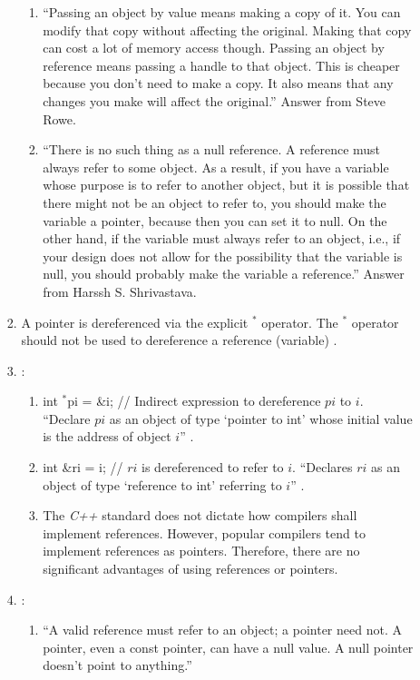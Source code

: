 \begin{enumerate}
\begin{enumerate}
\begin{enumerate}
\begin{enumerate}
			\item ``Passing an object by value means making a copy of it. You can modify that copy without affecting the original. Making that copy can cost a lot of memory access though. Passing an object by reference means passing a handle to that object. This is cheaper because you don't need to make a copy. It also means that any changes you make will affect the original.'' Answer from Steve Rowe.
			\item ``There is no such thing as a null reference. A reference must always refer to some object. As a result, if you have a variable whose purpose is to refer to another object, but it is possible that there might not be an object to refer to, you should make the variable a pointer, because then you can set it to null. On the other hand, if the variable must always refer to an object, i.e., if your design does not allow for the possibility that the variable is null, you should probably make the variable a reference.'' Answer from Harssh S. Shrivastava.
			\end{enumerate}
		\item A pointer is dereferenced via the explicit $^{\ast}$ operator. The $^{\ast}$ operator should not be used to dereference a reference (variable) \cite{Saks2001}.
		\item \cite{Saks2001}: \vspace{-0.1cm}
			\begin{enumerate} \itemsep -1pt
			\item int $^{\ast}$pi = {\&}i; // Indirect expression to dereference $pi$ to $i$. ``Declare $pi$ as an object of type `pointer to int' whose initial value is the address of object $i$'' \cite{Saks2001a}.
			\item int {\&}ri = i; // $ri$ is dereferenced to refer to $i$. ``Declares $ri$ as an object of type `reference to int' referring to $i$'' \cite{Saks2001a}.
			\item The {\it C++} standard does not dictate how compilers shall implement references. However, popular compilers tend to implement references as pointers. Therefore, there are no significant advantages of using references or pointers.
			\end{enumerate}
		\item \cite{Saks2001a}: \vspace{-0.1cm}
			\begin{enumerate} \itemsep -1pt
			\item ``A valid reference must refer to an object; a pointer need not. A pointer, even a const pointer, can have a null value. A null pointer doesn't point to anything.''

\end{enumerate}
\end{enumerate}
\end{enumerate}
\end{enumerate}
